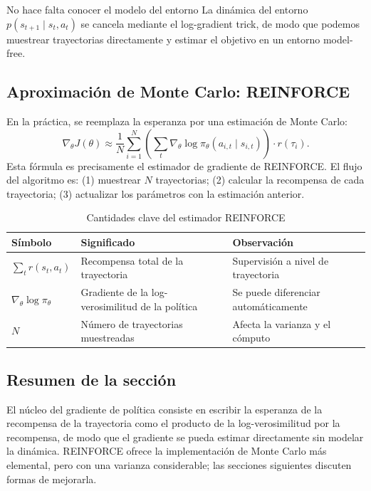 \begin{importantbox}{No hace falta conocer el modelo del entorno}
La dinámica del entorno $p(s_{t+1}\mid s_t,a_t)$ se cancela mediante el log-gradient trick, de modo que podemos muestrear trayectorias directamente y estimar el objetivo en un entorno model-free.
\end{importantbox}

\subsection{Aproximación de Monte Carlo: REINFORCE}

En la práctica, se reemplaza la esperanza por una estimación de Monte Carlo:
$$\nabla_\theta J(\theta) \approx \frac{1}{N} \sum_{i=1}^{N} \left(\sum_t \nabla_\theta \log \pi_\theta(a_{i,t}\mid s_{i,t})\right) \cdot r(\tau_i).$$
Esta fórmula es precisamente el estimador de gradiente de REINFORCE. El flujo del algoritmo es: (1) muestrear $N$ trayectorias; (2) calcular la recompensa de cada trayectoria; (3) actualizar los parámetros con la estimación anterior.

\begin{table}[H]
\centering
\small
\begin{tabular}{p{}p{}p{}}
\toprule
Símbolo & Significado & Observación \\
\midrule
$\sum_t r(s_t,a_t)$ & Recompensa total de la trayectoria & Supervisión a nivel de trayectoria \\
$\nabla_\theta \log \pi_\theta$ & Gradiente de la log-verosimilitud de la política & Se puede diferenciar automáticamente \\
$N$ & Número de trayectorias muestreadas & Afecta la varianza y el cómputo \\
\bottomrule
\end{tabular}
\caption{Cantidades clave del estimador REINFORCE}
\end{table}

\subsection{Resumen de la sección}

El núcleo del gradiente de política consiste en escribir la esperanza de la recompensa de la trayectoria como el producto de la log-verosimilitud por la recompensa, de modo que el gradiente se pueda estimar directamente sin modelar la dinámica. REINFORCE ofrece la implementación de Monte Carlo más elemental, pero con una varianza considerable; las secciones siguientes discuten formas de mejorarla.

